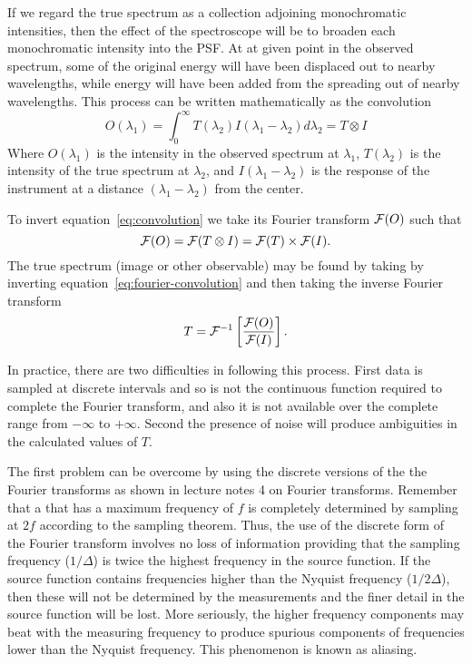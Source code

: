 \documentclass{article}
\newcommand{\be}{\begin{equation}}
\newcommand{\ee}{\end{equation}}
\def\cl#1{{\cal #1}}               %
\begin{document}
If we regard the true spectrum as a collection adjoining monochromatic intensities, then the effect of the spectroscope will be to broaden each monochromatic intensity into the PSF. At at given point in the observed spectrum, some of the original energy will have been displaced out to nearby wavelengths, while energy will have been added from the spreading out of nearby wavelengths. This process can be written mathematically as the convolution
\be
O(\lambda_1)=\int_0^{\infty} T(\lambda_2)I(\lambda_1-\lambda_2)d\lambda_2=T\otimes I
\label{eq:convolution}
\ee
Where $O(\lambda_1)$ is the intensity in the observed spectrum at $\lambda_1$, $T(\lambda_2)$ is the intensity of the true spectrum at $\lambda_2$, and $I(\lambda_1-\lambda_2)$ is the response of the instrument at a distance $(\lambda_1-\lambda_2)$ from the center.

To invert equation~\ref{eq:convolution} we take its Fourier transform $\cl{F}(O)$ such that
\be
\cl{F}(O)=\cl{F}(T\otimes I)=\cl{F}(T)\times\cl{F}(I).
\label{eq:fourier-convolution}
\ee
The true spectrum (image or other observable) may be found by taking by inverting equation~\ref{eq:fourier-convolution} and then taking the inverse Fourier transform
\[
T=\cl{F}^{-1}\left[{\cl{F}(O)\over\cl{F}(I)}\right].
\]

In practice, there are two difficulties in following this process. First data is sampled at discrete intervals and so is not the continuous function required to complete the Fourier transform, and also it is not available over the complete range from $-\infty$ to $+\infty$. Second the presence of noise will produce ambiguities in the calculated values of $T$.

The first problem can be overcome by using the discrete versions of the the Fourier transforms as shown in lecture notes 4 on Fourier transforms. Remember that a that has 
a maximum frequency of $f$ is completely determined by sampling at $2f$ according to the sampling theorem. Thus, the use of the discrete form of the Fourier transform involves no loss of information providing that the sampling frequency (${1/\Delta}$) is twice the highest frequency in the source function. If the source function contains frequencies higher than the Nyquist frequency (${1/2\Delta}$), then these will not be determined by the measurements and the finer detail in the source function will be lost. More seriously, the higher frequency components may beat with the measuring frequency to produce spurious components of frequencies lower than the Nyquist frequency. This phenomenon is known as aliasing. 
\end{document}

